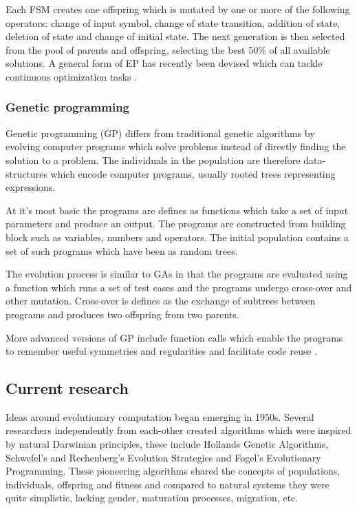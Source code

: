Each FSM creates one offspring which is mutated by one or more of the following operators: change of input symbol, change of state transition, addition of state, deletion of state and change of initial state. The next generation is then selected from the pool of parents and offspring, selecting the best 50\% of all available solutions. A general form of EP has recently been devised which can tackle continuous optimization tasks \cite{Michalewicz1997}.

\subsubsection{Genetic programming}

Genetic programming (GP) differs from traditional genetic algorithms by evolving computer programs which solve problems instead of directly finding the solution to a problem. The individuals in the population are therefore data-structures which encode computer programs, usually rooted trees representing expressions.

At it's most basic the programs are defines as functions which take a set of input parameters and produce an output. The programs are constructed from building block such as variables, numbers and operators. The initial population contains a set of such programs which have been as random trees.

The evolution process is similar to GAs in that the programs are evaluated using a function which runs a set of test cases and the programs undergo cross-over and other mutation. Cross-over is defines as the exchange of subtrees between programs and produces two offspring from two parents.

More advanced versions of GP include function calls which enable the programs to remember useful symmetries and regularities and facilitate code reuse \cite{Michalewicz1997}.

\subsection{Current research}

Ideas around evolutionary computation began emerging in 1950s. Several researchers independently from each-other created algorithms which were inspired by natural Darwinian principles, these include Hollands Genetic Algorithms, Schwefel's and Rechenberg's Evolution Strategies and Fogel's Evolutionary Programming. These pioneering algorithms shared the concepts of populations, individuals, offspring and fitness and compared to natural systems they were quite simplistic, lacking gender, maturation processes, migration, etc.

